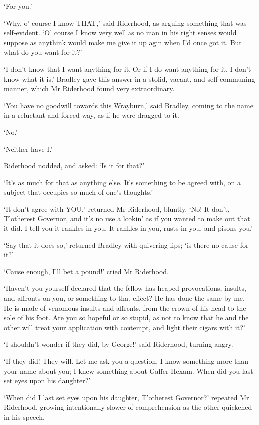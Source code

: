 ‘For you.’

‘Why, o’ course I know THAT,’ said Riderhood, as arguing something that
was self-evident. ‘O’ course I know very well as no man in his right
senses would suppose as anythink would make me give it up agin when I’d
once got it. But what do you want for it?’

‘I don’t know that I want anything for it. Or if I do want anything
for it, I don’t know what it is.’ Bradley gave this answer in a stolid,
vacant, and self-communing manner, which Mr Riderhood found very
extraordinary.

‘You have no goodwill towards this Wrayburn,’ said Bradley, coming to
the name in a reluctant and forced way, as if he were dragged to it.

‘No.’

‘Neither have I.’

Riderhood nodded, and asked: ‘Is it for that?’

‘It’s as much for that as anything else. It’s something to be agreed
with, on a subject that occupies so much of one’s thoughts.’

‘It don’t agree with YOU,’ returned Mr Riderhood, bluntly. ‘No! It
don’t, T’otherest Governor, and it’s no use a lookin’ as if you wanted
to make out that it did. I tell you it rankles in you. It rankles in
you, rusts in you, and pisons you.’

‘Say that it does so,’ returned Bradley with quivering lips; ‘is there
no cause for it?’

‘Cause enough, I’ll bet a pound!’ cried Mr Riderhood.

‘Haven’t you yourself declared that the fellow has heaped provocations,
insults, and affronts on you, or something to that effect? He has done
the same by me. He is made of venomous insults and affronts, from the
crown of his head to the sole of his foot. Are you so hopeful or so
stupid, as not to know that he and the other will treat your application
with contempt, and light their cigars with it?’

‘I shouldn’t wonder if they did, by George!’ said Riderhood, turning
angry.

‘If they did! They will. Let me ask you a question. I know something
more than your name about you; I knew something about Gaffer Hexam. When
did you last set eyes upon his daughter?’

‘When did I last set eyes upon his daughter, T’otherest Governor?’
repeated Mr Riderhood, growing intentionally slower of comprehension as
the other quickened in his speech.

